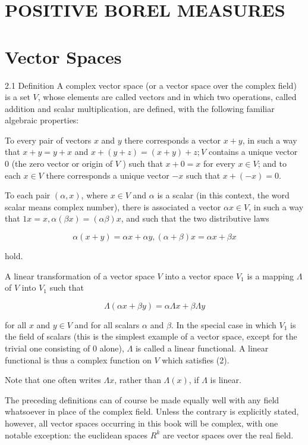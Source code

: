 \documentclass[10pt]{article}
\begin{document}
\section{POSITIVE BOREL MEASURES}
\section{Vector Spaces}
2.1 Definition A complex vector space (or a vector space over the complex field) is a set $V$, whose elements are called vectors and in which two operations, called addition and scalar multiplication, are defined, with the following familiar algebraic properties:

To every pair of vectors $x$ and $y$ there corresponds a vector $x+y$, in such a way that $x+y=y+x$ and $x+(y+z)=(x+y)+z ; V$ contains a unique vector 0 (the zero vector or origin of $V$ ) such that $x+0=x$ for every $x \in V$; and to each $x \in V$ there corresponds a unique vector $-x$ such that $x+(-x)=0$.

To each pair $(\alpha, x)$, where $x \in V$ and $\alpha$ is a scalar (in this context, the word scalar means complex number), there is associated a vector $\alpha x \in V$, in such a way that $1 x=x, \alpha(\beta x)=(\alpha \beta) x$, and such that the two distributive laws

$$
\alpha(x+y)=\alpha x+\alpha y,(\alpha+\beta) x=\alpha x+\beta x
$$

hold.

A linear transformation of a vector space $V$ into a vector space $V_{1}$ is a mapping $\Lambda$ of $V$ into $V_{1}$ such that

$$
\Lambda(\alpha x+\beta y)=\alpha \Lambda x+\beta \Lambda y
$$

for all $x$ and $y \in V$ and for all scalars $\alpha$ and $\beta$. In the special case in which $V_{1}$ is the field of scalars (this is the simplest example of a vector space, except for the trivial one consisting of 0 alone), $\Lambda$ is called a linear functional. A linear functional is thus a complex function on $V$ which satisfies (2).

Note that one often writes $\Lambda x$, rather than $\Lambda(x)$, if $\Lambda$ is linear.

The preceding definitions can of course be made equally well with any field whatsoever in place of the complex field. Unless the contrary is explicitly stated, however, all vector spaces occurring in this book will be complex, with one notable exception: the euclidean spaces $R^{k}$ are vector spaces over the real field.
\end{document}

